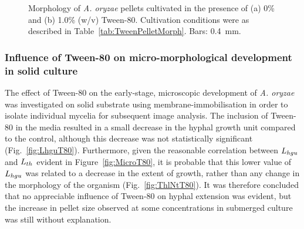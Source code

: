 \begin{figure}[hbtp]
	\centering
	\captionsetup[subfloat]{justification=centerlast}
	\hspace{0.5cm}
  \caption{Morphology of \emph{A. oryzae} pellets cultivated in the presence of (a) 0\% and (b) 1.0\% (w/v) Tween-80. Cultivation conditions were as described in Table~\ref{tab:TweenPelletMorph}. Bars: 0.4~mm.}
  \label{fig:PelletsT80}
\end{figure}

\subsubsection{Influence of Tween-80 on micro-morphological development in solid culture}

The effect of Tween-80 on the early-stage, microscopic development of \emph{A. oryzae} was investigated on solid substrate using membrane-immobilisation in order to isolate individual mycelia for subsequent image analysis. The inclusion of Tween-80 in the media resulted in a small decrease in the hyphal growth unit compared to the control, although this decrease was not statistically significant (Fig.~\ref{fig:LhguT80}). Furthermore, given the reasonable correlation between $L_{hgu}$ and $L_{th}$ evident in Figure~\ref{fig:MicroT80}, it is probable that this lower value of $L_{hgu}$ was related to a decrease in the extent of growth, rather than any change in the morphology of the organism (Fig.~\ref{fig:ThlNtT80}). It was therefore concluded that no appreciable influence of Tween-80 on hyphal extension was evident, but the increase in pellet size observed at some concentrations in submerged culture was still without explanation.

